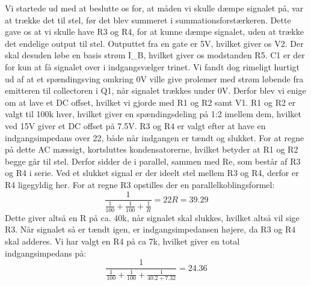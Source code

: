 Vi startede ud med at beslutte os for, at måden vi skulle dæmpe signalet på, var at trække det til stel, før det blev summeret i summationsforstærkeren. Dette gave os at vi skulle have R3 og R4, for at kunne dæmpe signalet, uden at trække det endelige output til stel. Outputtet fra en gate er 5V, hvilket giver os V2. Der skal desuden løbe en basis strøm I_B, hvilket giver os modstanden R5. C1 er der for kun at få signalet over i indgangsvælger trinet. Vi fandt dog rimeligt hurtigt ud af at et spændingsving omkring 0V ville give prolemer med strøm løbende fra emitteren til collectoren i Q1, når signalet trækkes under 0V. Derfor blev vi enige om at lave et DC offset, hvilket vi gjorde med R1 og R2 samt V1. R1 og R2 er valgt til 100k hver, hvilket giver en spændingsdeling på 1:2 imellem dem, hvilket ved 15V giver et DC offset på 7.5V. R3 og R4 er valgt efter at have en indgangsimpedans over 22, både når indgangen er tændt og slukket. For at regne på dette AC mæssigt, kortsluttes kondensatorerne, hvilket betyder at R1 og R2 begge går til stel. Derfor sidder de i parallel, sammen med Re, som består af R3 og R4 i serie. Ved et slukket signal er der ideelt stel mellem R3 og R4, derfor er R4 ligegyldig her. For at regne R3 opstilles der en parallelkoblingsformel:
\begin{equation}
\frac{1}{\frac{1}{100}+\frac{1}{100}+\frac{1}{R}}=22
R=39.29
\end{equation}
Dette giver altså en R på ca. 40k, når signalet skal slukkes, hvilket altså vil sige R3. Når signalet så er tændt igen, er indgangsimpedansen højere, da R3 og R4 skal adderes. Vi har valgt en R4 på ca 7k, hvilket giver en total indgangsimpedans på:
\begin{equation}
\frac{1}{\frac{1}{100}+\frac{1}{100}+\frac{1}{40.2+7.32}}=24.36
\end{equation}